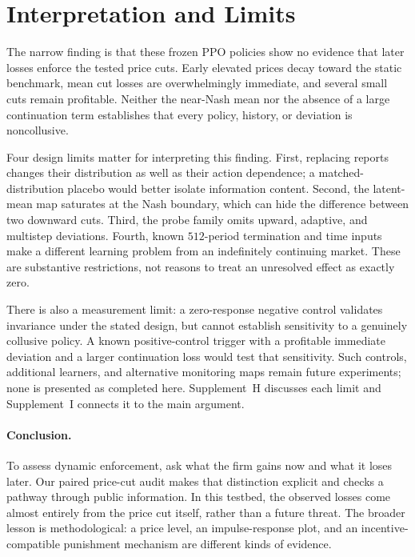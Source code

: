 \documentclass{article}
\begin{document}
\section{Interpretation and Limits}

The narrow finding is that these frozen PPO policies show no evidence that later losses enforce the tested price cuts. Early elevated prices decay toward the static benchmark, mean cut losses are overwhelmingly immediate, and several small cuts remain profitable. Neither the near-Nash mean nor the absence of a large continuation term establishes that every policy, history, or deviation is noncollusive.

Four design limits matter for interpreting this finding. First, replacing reports changes their distribution as well as their action dependence; a matched-distribution placebo would better isolate information content. Second, the latent-mean map saturates at the Nash boundary, which can hide the difference between two downward cuts. Third, the probe family omits upward, adaptive, and multistep deviations. Fourth, known $512$-period termination and time inputs make a different learning problem from an indefinitely continuing market. These are substantive restrictions, not reasons to treat an unresolved effect as exactly zero.

There is also a measurement limit: a zero-response negative control validates invariance under the stated design, but cannot establish sensitivity to a genuinely collusive policy. A known positive-control trigger with a profitable immediate deviation and a larger continuation loss would test that sensitivity. Such controls, additional learners, and alternative monitoring maps remain future experiments; none is presented as completed here. Supplement~H discusses each limit and Supplement~I connects it to the main argument.

\paragraph{Conclusion.}
To assess dynamic enforcement, ask what the firm gains now and what it loses later. Our paired price-cut audit makes that distinction explicit and checks a pathway through public information. In this testbed, the observed losses come almost entirely from the price cut itself, rather than a future threat. The broader lesson is methodological: a price level, an impulse-response plot, and an incentive-compatible punishment mechanism are different kinds of evidence.
\end{document}
